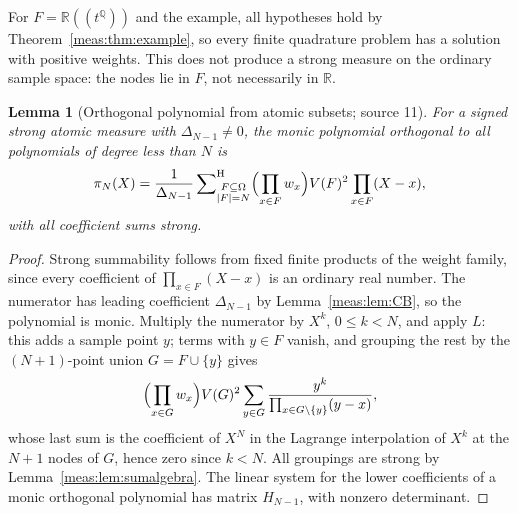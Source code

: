 \documentclass[11pt]{article}
\numberwithin{equation}{section}
\newtheorem{lemma}[theorem]{Lemma}
\theoremstyle{definition}
\theoremstyle{remark}
\newcommand{\R}{\mathbb R}
\newcommand{\Q}{\mathbb Q}
\newcommand{\hsum}{\mathop{\sum}\nolimits^{\mathrm H}}
\newcommand{\abs}[1]{\lvert#1\rvert}
\begin{document}
For $F=\R((t^\Q))$ and the example, all hypotheses hold by
Theorem~\ref{meas:thm:example}, so every finite quadrature problem has a
solution with positive weights. This does not produce a strong measure on the
ordinary sample space: the nodes lie in $F$, not necessarily in $\R$.

\begin{lemma}[Orthogonal polynomial from atomic subsets; source 11]
\label{meas:lem:heine}
For a signed strong atomic measure with $\Delta_{N-1}\ne0$, the monic polynomial
orthogonal to all polynomials of degree less than $N$ is
\begin{equation}\label{meas:eq:heine}
 \pi_N(X)=\frac1{\Delta_{N-1}}\hsum_{\substack{F\subseteq\Omega\\\abs F=N}}
 \Bigl(\prod_{x\in F}w_x\Bigr)V(F)^2\prod_{x\in F}(X-x),
\end{equation}
with all coefficient sums strong.
\end{lemma}
\begin{proof}
Strong summability follows from fixed finite products of the weight family,
since every coefficient of $\prod_{x\in F}(X-x)$ is an ordinary real number. The
numerator has leading coefficient $\Delta_{N-1}$ by Lemma~\ref{meas:lem:CB}, so the
polynomial is monic. Multiply the numerator by $X^k$, $0\le k<N$, and apply $L$:
this adds a sample point $y$; terms with $y\in F$ vanish, and grouping the rest by
the $(N+1)$-point union $G=F\cup\{y\}$ gives
\[
 \Bigl(\prod_{x\in G}w_x\Bigr)V(G)^2\sum_{y\in G}
 \frac{y^k}{\prod_{x\in G\setminus\{y\}}(y-x)} ,
\]
whose last sum is the coefficient of $X^N$ in the Lagrange interpolation of $X^k$
at the $N+1$ nodes of $G$, hence zero since $k<N$. All groupings are strong by
Lemma~\ref{meas:lem:sumalgebra}. The linear system for the lower coefficients of
a monic orthogonal polynomial has matrix $H_{N-1}$, with nonzero determinant.
\end{proof}
\end{document}
